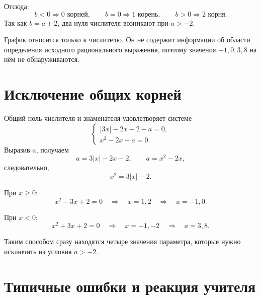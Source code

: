 \parametergraphfigure

Отсюда:
\[
  b<0\Rightarrow0\text{ корней},\qquad
  b=0\Rightarrow1\text{ корень},\qquad
  b>0\Rightarrow2\text{ корня}.
\]
Так как \(b=a+2\), два нуля числителя возникают при \(a>-2\).

\begin{warningbox}
  График относится только к числителю. Он не содержит информации об области
  определения исходного рационального выражения, поэтому значения
  \(-1,0,3,8\) на нём не обнаруживаются.
\end{warningbox}

\section{Исключение общих корней}

Общий ноль числителя и знаменателя удовлетворяет системе
\[
  \begin{cases}
    |3x|-2x-2-a=0,\\
    x^2-2x-a=0.
  \end{cases}
\]
Выразив \(a\), получаем
\[
  a=3|x|-2x-2,
  \qquad
  a=x^2-2x,
\]
следовательно,
\[
  x^2=3|x|-2.
\]

При \(x\ge0\):
\[
  x^2-3x+2=0
  \quad\Longrightarrow\quad
  x=1,2
  \quad\Longrightarrow\quad
  a=-1,0.
\]

При \(x<0\):
\[
  x^2+3x+2=0
  \quad\Longrightarrow\quad
  x=-1,-2
  \quad\Longrightarrow\quad
  a=3,8.
\]

Таким способом сразу находятся четыре значения параметра, которые нужно
исключить из условия \(a>-2\).

\section{Типичные ошибки и реакция учителя}

